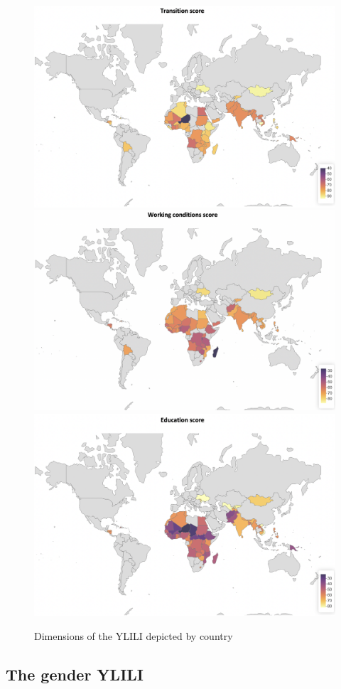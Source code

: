\documentclass[
  a4paper, twoside, 12pt]{book}
\begin{document}
\begin{figure}[H]

{\centering \includegraphics[width=0.69\linewidth,]{figures/maps/transition_total} \includegraphics[width=0.69\linewidth,]{figures/maps/working_conditions_total} \includegraphics[width=0.69\linewidth,]{figures/maps/education_total} 

}

\caption{Dimensions of the YLILI depicted by country}\label{fig:fig-totalmap}
\end{figure}

\newpage

\hypertarget{genderylili}{%
\subsection*{The gender YLILI}\label{genderylili}}
\end{document}
